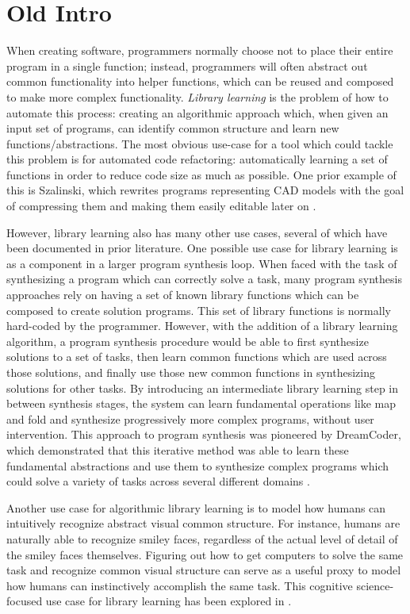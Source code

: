 \section{Old Intro}

When creating software, programmers normally choose not to place their
entire program in a single function; instead, programmers will often abstract
out common functionality into helper functions, which can be reused and composed
to make more complex functionality.
%
\emph{Library learning} is the problem of how to automate this process: creating
an algorithmic approach which, when given an input set of programs, can
identify common structure and learn new functions/abstractions.
%
The most obvious use-case for a tool which could tackle this problem is
for automated code refactoring: automatically learning a set of functions
in order to reduce code size as much as possible.
%
One prior example of this is Szalinski, which rewrites programs representing
CAD models with the goal of compressing them and making them easily editable
later on \cite{szalinski}.

However, library learning also has many other use cases,
several of which have been documented in prior literature.
%
One possible use case for library learning is as a component in a larger
program synthesis loop.
%
When faced with the task of synthesizing a program which can correctly solve
a task, many program synthesis approaches rely on having a set of known
library functions which can be composed to create solution programs.
%
This set of library functions is normally hard-coded by the programmer.
%
However, with the addition of a library learning algorithm, a program synthesis
procedure would be able to first synthesize solutions to a set of tasks,
then learn common functions which are used across those solutions,
and finally use those new common functions in synthesizing solutions for other
tasks.
%
By introducing an intermediate library learning step in between synthesis
stages, the system can learn fundamental operations like map and fold and
synthesize progressively more complex programs, without user intervention.
%
This approach to program synthesis was pioneered by DreamCoder,
which demonstrated that this iterative method was able to learn these
fundamental abstractions and use them to synthesize complex programs
which could solve a variety of tasks across several different domains
\cite{dreamcoder}.

Another use case for algorithmic library learning is to model how humans can
intuitively recognize abstract visual common structure.
%
For instance, humans are naturally able to recognize smiley faces, regardless
of the actual level of detail of the smiley faces themselves.
%
Figuring out how to get computers to solve the same task and recognize common
visual structure can serve as a useful proxy to model how humans can
instinctively accomplish the same task.
%
This cognitive science-focused use case for library learning has been explored
in \cite{cogsci-smiley}.

